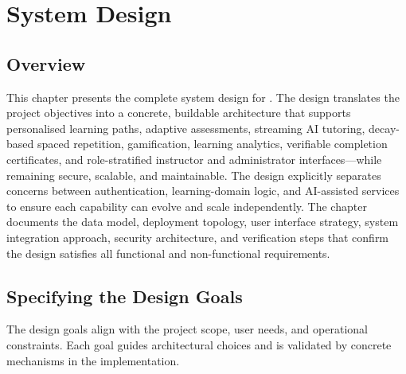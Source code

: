 \chapter{System Design}

\section{Overview}

This chapter presents the complete system design for \projectname. The design translates the project objectives into a concrete, buildable architecture that supports personalised learning paths, adaptive assessments, streaming AI tutoring, decay-based spaced repetition, gamification, learning analytics, verifiable completion certificates, and role-stratified instructor and administrator interfaces---while remaining secure, scalable, and maintainable. The design explicitly separates concerns between authentication, learning-domain logic, and AI-assisted services to ensure each capability can evolve and scale independently. The chapter documents the data model, deployment topology, user interface strategy, system integration approach, security architecture, and verification steps that confirm the design satisfies all functional and non-functional requirements.

\section{Specifying the Design Goals}

The design goals align with the project scope, user needs, and operational constraints. Each goal guides architectural choices and is validated by concrete mechanisms in the implementation.

